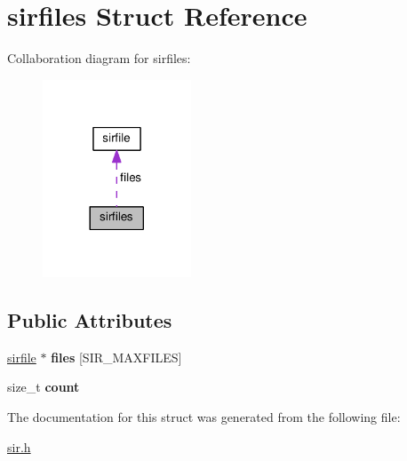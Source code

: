 \hypertarget{structsirfiles}{}\section{sirfiles Struct Reference}
\label{structsirfiles}


Collaboration diagram for sirfiles\+:\nopagebreak
\begin{figure}[H]
\begin{center}
\leavevmode
\includegraphics[width=125pt]{structsirfiles__coll__graph}
\end{center}
\end{figure}
\subsection*{Public Attributes}
\begin{DoxyCompactItemize}
\item 
\hyperlink{structsirfile}{sirfile} $\ast$ {\bfseries files} \mbox{[}S\+I\+R\+\_\+\+M\+A\+X\+F\+I\+L\+ES\mbox{]}\hypertarget{structsirfiles_a65c5e5be7ebd527d2304fc8d6cf30b45}{}\label{structsirfiles_a65c5e5be7ebd527d2304fc8d6cf30b45}

\item 
size\+\_\+t {\bfseries count}\hypertarget{structsirfiles_a021828ca86b408a02dee81fb8e4ade6f}{}\label{structsirfiles_a021828ca86b408a02dee81fb8e4ade6f}

\end{DoxyCompactItemize}


The documentation for this struct was generated from the following file\+:\begin{DoxyCompactItemize}
\item 
\hyperlink{sir_8h}{sir.\+h}\end{DoxyCompactItemize}
